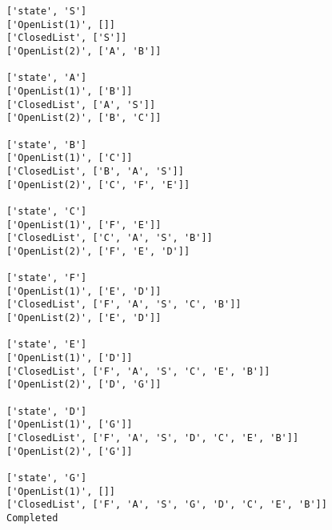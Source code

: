 \documentclass[11pt]{article}
\makeatletter
\newcommand{\boxspacing}{\kern\kvtcb@left@rule\kern\kvtcb@boxsep}
\newcommand{\prompt}[4]{
        {\ttfamily\llap{{\color{#2}[#3]:\hspace{3pt}#4}}\vspace{-\baselineskip}}
    }
\makeatother
\begin{document}
    \begin{Verbatim}[commandchars=\\\{\}]
['state', 'S']
['OpenList(1)', []]
['ClosedList', ['S']]
['OpenList(2)', ['A', 'B']]

['state', 'A']
['OpenList(1)', ['B']]
['ClosedList', ['A', 'S']]
['OpenList(2)', ['B', 'C']]

['state', 'B']
['OpenList(1)', ['C']]
['ClosedList', ['B', 'A', 'S']]
['OpenList(2)', ['C', 'F', 'E']]

['state', 'C']
['OpenList(1)', ['F', 'E']]
['ClosedList', ['C', 'A', 'S', 'B']]
['OpenList(2)', ['F', 'E', 'D']]

['state', 'F']
['OpenList(1)', ['E', 'D']]
['ClosedList', ['F', 'A', 'S', 'C', 'B']]
['OpenList(2)', ['E', 'D']]

['state', 'E']
['OpenList(1)', ['D']]
['ClosedList', ['F', 'A', 'S', 'C', 'E', 'B']]
['OpenList(2)', ['D', 'G']]

['state', 'D']
['OpenList(1)', ['G']]
['ClosedList', ['F', 'A', 'S', 'D', 'C', 'E', 'B']]
['OpenList(2)', ['G']]

['state', 'G']
['OpenList(1)', []]
['ClosedList', ['F', 'A', 'S', 'G', 'D', 'C', 'E', 'B']]
Completed
    \end{Verbatim}

    \begin{tcolorbox}[breakable, size=fbox, boxrule=1pt, pad at break*=1mm,colback=cellbackground, colframe=cellborder]
\prompt{In}{incolor}{ }{\boxspacing}
\begin{Verbatim}[commandchars=\\\{\}]

\end{Verbatim}
\end{tcolorbox}
\end{document}
